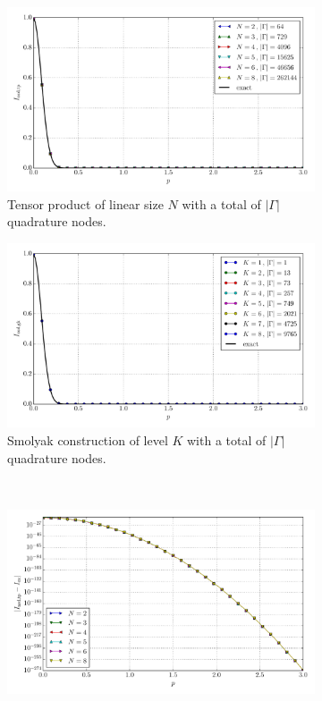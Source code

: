 \documentclass[a4paper,10pt]{article}
\begin{document}
\begin{figure}[ht!]
  \begin{subfigure}[t]{0.5\linewidth}
    \includegraphics[width=\linewidth]{./plots/tp_sg_6d_conv_p_(0,0,0,0,0,0)_(0,0,0,0,0,0)_val_nsd_tp.pdf}
    \caption{Tensor product of linear size $N$ with a total of $|\Gamma|$ quadrature nodes.}
    \label{fig:tp_sg_6d_conv_p_000000_000000_val_nsd_tp}
  \end{subfigure}
  \begin{subfigure}[t]{0.5\linewidth}
    \includegraphics[width=\linewidth]{./plots/tp_sg_6d_conv_p_(0,0,0,0,0,0)_(0,0,0,0,0,0)_val_nsd_gk.pdf}
    \caption{Smolyak construction of level $K$ with a total of $|\Gamma|$ quadrature nodes.}
    \label{fig:tp_sg_6d_conv_p_000000_000000_val_nsd_gk}
  \end{subfigure} \\
  \begin{subfigure}[t]{0.5\linewidth}
    \includegraphics[width=\linewidth]{./plots/tp_sg_6d_conv_p_(0,0,0,0,0,0)_(0,0,0,0,0,0)_err_nsd_tp.pdf}

\end{subfigure}
\end{figure}
\end{document}
